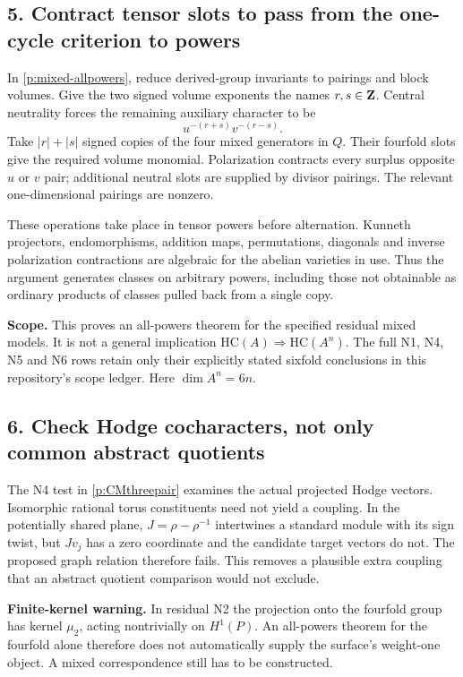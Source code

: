 \subsection*{5. Contract tensor slots to pass from the one-cycle criterion to powers}
In \ref{p:mixed-allpowers}, reduce derived-group invariants to pairings and block volumes. Give the two signed volume exponents the names $r,s\in\mathbf Z$. Central neutrality forces the remaining auxiliary character to be
\[
                         u^{-(r+s)}v^{-(r-s)}.
\]
Take $|r|+|s|$ signed copies of the four mixed generators in $Q$. Their fourfold slots give the required volume monomial. Polarization contracts every surplus opposite $u$ or $v$ pair; additional neutral slots are supplied by divisor pairings. The relevant one-dimensional pairings are nonzero.

These operations take place in tensor powers before alternation. Kunneth projectors, endomorphisms, addition maps, permutations, diagonals and inverse polarization contractions are algebraic for the abelian varieties in use. Thus the argument generates classes on arbitrary powers, including those not obtainable as ordinary products of classes pulled back from a single copy.

\textbf{Scope.} This proves an all-powers theorem for the specified residual mixed models. It is not a general implication $\mathrm{HC}(A)\Rightarrow\mathrm{HC}(A^n)$. The full N1, N4, N5 and N6 rows retain only their explicitly stated sixfold conclusions in this repository's scope ledger. Here $\dim A^n=6n$.

\subsection*{6. Check Hodge cocharacters, not only common abstract quotients}
The N4 test in \ref{p:CMthreepair} examines the actual projected Hodge vectors. Isomorphic rational torus constituents need not yield a coupling. In the potentially shared plane, $J=\rho-\rho^{-1}$ intertwines a standard module with its sign twist, but $Jv_j$ has a zero coordinate and the candidate target vectors do not. The proposed graph relation therefore fails. This removes a plausible extra coupling that an abstract quotient comparison would not exclude.

\textbf{Finite-kernel warning.} In residual N2 the projection onto the fourfold group has kernel $\mu_2$, acting nontrivially on $H^1(P)$. An all-powers theorem for the fourfold alone therefore does not automatically supply the surface's weight-one object. A mixed correspondence still has to be constructed.
\newpage
